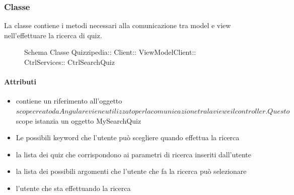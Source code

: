 \subsubsection{Classe }
La classe contiene i metodi necessari alla comunicazione tra model e view nell'effettuare la ricerca di quiz.
\begin{figure}[H]
\centering
\noindent{}
\caption[Schema Classe CtrlSearchQuiz]{Schema Classe Quizzipedia:: Client:: ViewModelClient:: CtrlServices:: CtrlSearchQuiz}
\end{figure}
\paragraph{Attributi}
\begin{itemize}
\item {}
\newline
contiene un riferimento all'oggetto $scope creato da Angular e viene utilizzato per la comunicazione tra la view e il controller. Questo $scope istanzia un oggetto MySearchQuiz
\item {}
\newline
Le possibili keyword che l'utente può scegliere quando effettua la ricerca
\item {}
\newline
la lista dei quiz che corrispondono ai parametri di ricerca inseriti dall'utente
\item {}
\newline
la lista dei possibili argomenti che l'utente che fa la ricerca può selezionare
\item {}
\newline
l'utente che sta effettuando la ricerca
\end{itemize}

